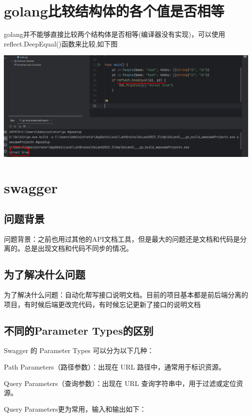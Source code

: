 \documentclass[12pt]{article}
\begin{document}
	\section{golang比较结构体的各个值是否相等}
	golang并不能够直接比较两个结构体是否相等(编译器没有实现)，可以使用reflect.DeepEqual()函数来比较,如下图
	
	\includegraphics[scale=0.4]{11.png}
		
	\section{swagger}
	
	\subsection{问题背景}
	问题背景：之前也用过其他的API文档工具，但是最大的问题还是文档和代码是分离的。总是出现文档和代码不同步的情况。
	\subsection{为了解决什么问题}
	为了解决什么问题：自动化帮写接口说明文档。目前的项目基本都是前后端分离的项目，有时候后端更改完代码，有时候忘记更新了接口的说明文档
	\subsection{不同的Parameter Types的区别}
	Swagger 的 Parameter Types 可以分为以下几种：
	
	Path Parameters（路径参数）：出现在 URL 路径中，通常用于标识资源。
	
	Query Parameters（查询参数）：出现在 URL 查询字符串中，用于过滤或定位资源。
	
	Query Parameters更为常用，输入和输出如下：
	
\end{document}
